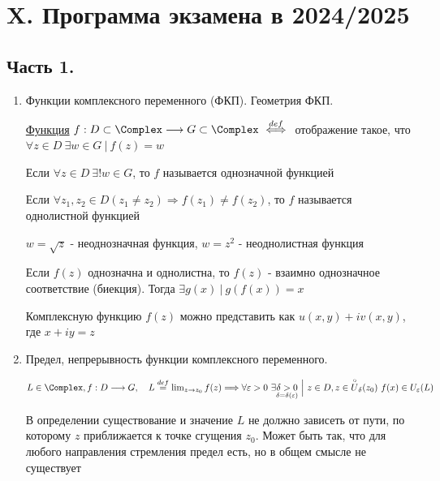 \documentclass[12pt]{article}
\begin{document}

\clearpage

\section{X. Программа экзамена в 2024/2025}

\subsection{Часть 1.}

\begin{enumerate}
    \item Функции комплексного переменного (ФКП). Геометрия ФКП.

    \Defs \hyperlink{complex_function}{Функция} $f : D \subset \Complex \longrightarrow G \subset \Complex \ \overset{def}{\Longleftrightarrow} \ $ отображение такое, 
    что $\forall z \in D \ \exists w \in G \ | \ f(z) = w$

    \Defs Если $\forall z \in D \ \exists! w \in G$, то $f$ называется однозначной функцией

    \Defs Если $\forall z_1, z_2 \in D (z_1 \neq z_2) \Longrightarrow f(z_1) \neq f(z_2)$, 
    то $f$ называется однолистной функцией
    
    \Exs $w = \sqrt{z}$ - неоднозначная функция, $w = z^2$ - неоднолистная функция

    \Notas Если $f(z)$ однозначна и однолистна, то $f(z)$ - взаимно однозначное соответствие (биекция). Тогда $\exists g(x) \ | \ g(f(x)) = x$
    
    Комплексную функцию $f(z)$ можно представить как $u(x, y) + i v(x, y)$, где $x + iy = z$

    \item Предел, непрерывность функции комплексного переменного.

     $L \in \Complex, f : D \longrightarrow G, \quad L \overset{def}{=} \lim_{z \to z_0} f(z) \Longrightarrow
    \forall \varepsilon > 0 \ \exists \underset{\delta = \delta(\varepsilon)}{\delta > 0} \ \Big| \ z \in D, z \in \overset{\circ}{U}_\delta(z_0) \ f(x) \in U_\varepsilon(L)$

    В определении существование и значение $L$ не должно зависеть от пути, по которому $z$ приближается к точке сгущения $z_0$.
    Может быть так, что для любого направления стремления предел есть, но в общем смысле не существует


\end{enumerate}
\end{document}
